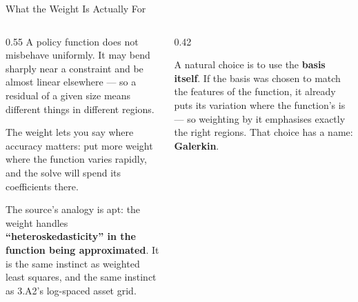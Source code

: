 \begin{frame}{What the Weight Is Actually For}
\begin{columns}[T]
\begin{column}{0.55\textwidth}
\small
A policy function does not misbehave uniformly. It may bend sharply near a constraint and be almost linear elsewhere --- so a residual of a given size means different things in different regions.
\medskip

The weight lets you say where accuracy matters: put more weight where the function varies rapidly, and the solve will spend its coefficients there.
\medskip

The source's analogy is apt: the weight handles \textbf{``heteroskedasticity'' in the function being approximated}. It is the same instinct as weighted least squares, and the same instinct as 3.A2's log-spaced asset grid.
\end{column}
\begin{column}{0.42\textwidth}
\begin{conceptbox}[title=\textbf{Basis functions as weights}]\small
A natural choice is to use the \textbf{basis itself}. If the basis was chosen to match the features of the function, it already puts its variation where the function's is --- so weighting by it emphasises exactly the right regions.
\medskip
That choice has a name: \textbf{Galerkin}.
\end{conceptbox}
\end{column}
\end{columns}
\vspace{1mm}
\end{frame}

